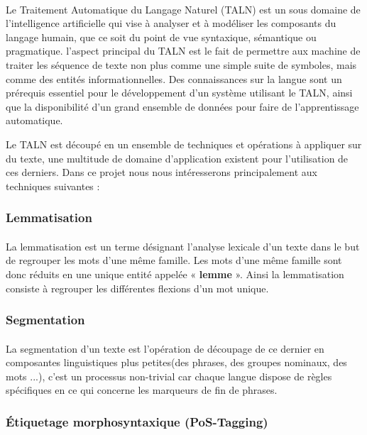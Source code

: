 \documentclass[]{report}
\begin{document}
			\paragraph{}
			Le Traitement Automatique du Langage Naturel (TALN) est un sous domaine de l'intelligence artificielle qui vise à analyser et à modéliser les composants du langage humain, que ce soit du point de vue syntaxique, sémantique ou pragmatique. l'aspect principal du TALN est le fait de permettre aux machine de traiter les séquence de texte non plus comme une simple suite de symboles, mais comme des entités informationnelles. Des connaissances sur la langue sont un prérequis essentiel pour le développement d'un système utilisant le TALN, ainsi que la disponibilité d'un grand ensemble de données pour faire de l'apprentissage automatique.
			\par 
			Le TALN est découpé en un ensemble de techniques et opérations à appliquer sur du texte, une multitude de domaine d'application existent pour l'utilisation de ces derniers. Dans ce projet nous nous intéresserons principalement aux techniques suivantes :  
			\subsubsection{Lemmatisation} 
				\paragraph{}
				La lemmatisation est un terme désignant l’analyse lexicale d’un texte dans le but de regrouper les mots d’une même famille. Les mots d’une même famille sont donc réduits en une unique entité appelée « \textbf{lemme} ».
				Ainsi la lemmatisation consiste à regrouper les différentes flexions d’un mot unique.\cite{lemme}
				
			\subsubsection{Segmentation}
				\paragraph{}
				La segmentation d'un texte est l'opération de découpage de ce dernier en composantes linguistiques plus petites(des phrases, des groupes nominaux, des mots ...), c'est un processus non-trivial car chaque langue dispose de règles spécifiques en ce qui concerne les marqueurs de fin de phrases.
			
			\subsubsection{Étiquetage morphosyntaxique (PoS-Tagging)}
\end{document}
